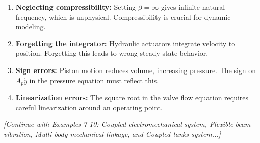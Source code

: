 \begin{example}
\begin{enumerate}
    \item \textbf{Neglecting compressibility:} Setting $\beta = \infty$ gives infinite natural frequency, which is unphysical. Compressibility is crucial for dynamic modeling.

    \item \textbf{Forgetting the integrator:} Hydraulic actuators integrate velocity to position. Forgetting this leads to wrong steady-state behavior.

    \item \textbf{Sign errors:} Piston motion reduces volume, increasing pressure. The sign on $A_p\dot{y}$ in the pressure equation must reflect this.

    \item \textbf{Linearization errors:} The square root in the valve flow equation requires careful linearization around an operating point.
\end{enumerate}

\end{example}


\textit{[Continue with Examples 7-10: Coupled electromechanical system, Flexible beam vibration, Multi-body mechanical linkage, and Coupled tanks system...]}


